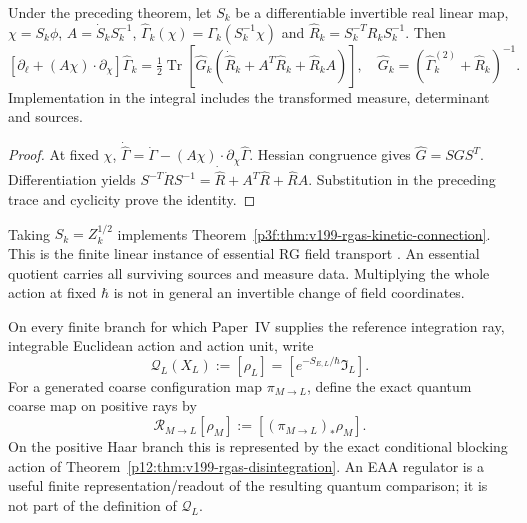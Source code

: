 \documentclass[12pt,a4paper]{article}
\begin{document}
\begin{theorem}
\label{p12:thm:v199-rgas-moving-eaa}
Under the preceding theorem, let \(S_k\) be a differentiable invertible
real linear map, \(\chi=S_k\phi\), \(A=\dot S_kS_k^{-1}\),
\(\widehat\Gamma_k(\chi)=\Gamma_k(S_k^{-1}\chi)\) and
\(\widehat R_k=S_k^{-T}R_kS_k^{-1}\).  Then
\begin{equation}
\label{p12:eq:v199-rgas-moving-eaa}
 [\partial_\ell+(A\chi)\cdot\partial_\chi]\widehat\Gamma_k
 =\tfrac12\operatorname{Tr}\left[
 \widehat G_k(\dot{\widehat R}_k+A^T\widehat R_k+\widehat R_kA)
 \right],\quad
 \widehat G_k=(\widehat\Gamma_k^{(2)}+\widehat R_k)^{-1}.
\end{equation}
Implementation in the integral includes the transformed measure,
determinant and sources.
\end{theorem}
\begin{proof}
At fixed \(\chi\),
\(\dot{\widehat\Gamma}=\dot\Gamma-(A\chi)\cdot\partial_\chi\widehat\Gamma\).
Hessian congruence gives \(\widehat G=SGS^T\).
Differentiation yields
\(S^{-T}\dot R S^{-1}=\dot{\widehat R}+A^T\widehat R+\widehat R A\).
Substitution in the preceding trace and cyclicity prove the identity.
\end{proof}
Taking \(S_k=Z_k^{1/2}\) implements
Theorem~\ref{p3f:thm:v199-rgas-kinetic-connection}.
This is the finite linear instance of essential RG field transport
\cite{BaldazziZinatiFalls2022EssentialRG}.
An essential quotient carries all surviving sources and measure data.
Multiplying the whole action at fixed \(\hbar\) is not in general an
invertible change of field coordinates.

\begin{definition}
\label{p12:def:finite-generated-quantum-constructor}
On every finite branch for which Paper~IV supplies the reference integration
ray, integrable Euclidean action and action unit, write
\[
 \boxed{
 \mathcal Q_L(X_L)
 :=[\rho_L]
 =\left[e^{-S_{E,L}/\hbar}\mathfrak I_L\right].}
\]
For a generated coarse configuration map $\pi_{M\to L}$, define the exact
quantum coarse map on positive rays by
\[
 \boxed{\mathcal R_{M\to L}[\rho_M]
 :=[(\pi_{M\to L})_*\rho_M].}
\]
On the positive Haar branch this is represented by the exact conditional
blocking action of Theorem~\ref{p12:thm:v199-rgas-disintegration}.  An EAA
regulator is a useful finite representation/readout of the resulting quantum
comparison; it is not part of the definition of $\mathcal Q_L$.
\end{definition}
\end{document}
